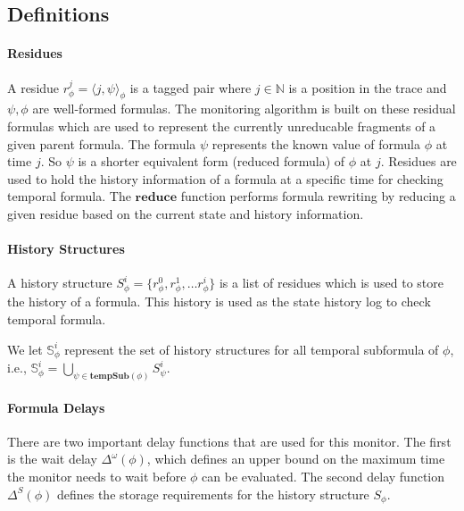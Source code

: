 \documentclass[]{llncs}
\newcommand{\rpt}[3]{\ensuremath{\langle #1, #2 \rangle}_{#3}}
\begin{document}
\subsection{Definitions}
\paragraph{Residues}
A residue $r^j_{\phi} = \rpt{j}{\psi}{\phi}$ is a tagged pair where $j \in \mathbb{N}$ is a position in the trace and $\psi, \phi$ are well-formed formulas. The monitoring algorithm is built on these residual formulas which are used to represent the currently unreducable fragments of a given parent formula. 
The formula $\psi$ represents the known value of formula $\phi$ at time $j$. So $\psi$ is a shorter equivalent form (reduced formula) of $\phi$ at $j$. 
Residues are used to hold the history information of a formula at a specific time for checking temporal formula.
The $\mathbf{reduce}$ function performs formula rewriting by reducing a given residue based on the current state and history information. 


\paragraph{History Structures}
A history structure $S_{\phi}^i = \{ r_{\phi}^0, r_{\phi}^1, \ldots r_{\phi}^i \}$ is a list of residues which is used to store the history of a formula. This history is used as the state history log to check temporal formula. 

We let $\mathbb{S}^i_{\phi}$ represent the set of history structures for all temporal subformula of $\phi$, i.e., $\mathbb{S}^i_{\phi} = \bigcup_{\psi \in \mathbf{tempSub}(\phi)} S^i_{\psi}$.

\paragraph{Formula Delays}
There are two important delay functions that are used for this monitor. The first is the wait delay $\Delta^{\omega}(\phi)$, which defines an upper bound on the maximum time the monitor needs to wait before $\phi$ can be evaluated.
%
The second delay function $\Delta^{S}(\phi)$ defines the storage requirements for the history structure $S_\phi$.
\end{document}
